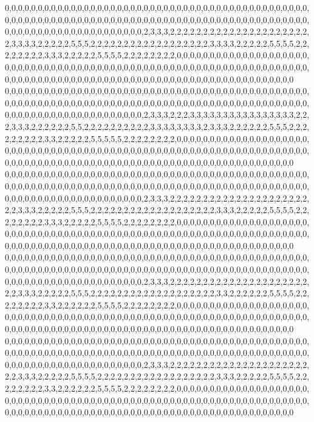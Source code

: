 0,0,0,0,0,0,0,0,0,0,0,0,0,0,0,0,0,0,0,0,0,0,0,0,0,0,0,0,0,0,0,0,0,0,0,0,0,0,0,0,0,0,0,0,0,0,0,0,0,0,0,0,0,0,0,0,0,0,0,0,0,0,0,0,0,0,0,0,0,0,0,0,0,0,0,0,0,0,0,0,0,0,0,0,0,0,0,0,0,0,0,0,0,0,0,0,0,0,0,0,0,0,0,0,0,0,0,0,0,0,0,0,0,2,3,3,3,2,2,2,2,2,2,2,2,2,2,2,2,2,2,2,2,2,2,2,2,2,2,3,3,3,3,2,2,2,2,2,5,5,5,2,2,2,2,2,2,2,2,2,2,2,2,2,2,2,2,2,2,3,3,3,3,2,2,2,2,2,5,5,5,5,2,2,2,2,2,2,2,2,3,3,3,2,2,2,2,2,5,5,5,5,2,2,2,2,2,2,2,2,0,0,0,0,0,0,0,0,0,0,0,0,0,0,0,0,0,0,0,0,0,0,0,0,0,0,0,0,0,0,0,0,0,0,0,0,0,0,0,0,0,0,0,0,0,0,0,0,0,0,0,0,0,0,0,0,0,0,0,0,0,0,0,0,0,0,0,0,0,0,0,0,0,0,0,0,0,0,0,0,0,0,0,0,0,0,0,0,0,0,0,0,0,0,0,0,0,0,0,0,0,0,0,0,0,0,0,0,0,0
0,0,0,0,0,0,0,0,0,0,0,0,0,0,0,0,0,0,0,0,0,0,0,0,0,0,0,0,0,0,0,0,0,0,0,0,0,0,0,0,0,0,0,0,0,0,0,0,0,0,0,0,0,0,0,0,0,0,0,0,0,0,0,0,0,0,0,0,0,0,0,0,0,0,0,0,0,0,0,0,0,0,0,0,0,0,0,0,0,0,0,0,0,0,0,0,0,0,0,0,0,0,0,0,0,0,0,0,0,0,0,0,0,2,3,3,3,2,2,2,3,3,3,3,3,3,3,3,3,3,3,3,3,3,3,3,2,2,2,3,3,3,2,2,2,2,2,2,5,5,2,2,2,2,2,2,2,2,2,2,3,3,3,3,3,3,3,3,2,3,3,3,2,2,2,2,2,2,5,5,5,2,2,2,2,2,2,2,2,2,3,3,2,2,2,2,2,5,5,5,5,5,2,2,2,2,2,2,2,2,0,0,0,0,0,0,0,0,0,0,0,0,0,0,0,0,0,0,0,0,0,0,0,0,0,0,0,0,0,0,0,0,0,0,0,0,0,0,0,0,0,0,0,0,0,0,0,0,0,0,0,0,0,0,0,0,0,0,0,0,0,0,0,0,0,0,0,0,0,0,0,0,0,0,0,0,0,0,0,0,0,0,0,0,0,0,0,0,0,0,0,0,0,0,0,0,0,0,0,0,0,0,0,0,0,0,0,0,0,0
0,0,0,0,0,0,0,0,0,0,0,0,0,0,0,0,0,0,0,0,0,0,0,0,0,0,0,0,0,0,0,0,0,0,0,0,0,0,0,0,0,0,0,0,0,0,0,0,0,0,0,0,0,0,0,0,0,0,0,0,0,0,0,0,0,0,0,0,0,0,0,0,0,0,0,0,0,0,0,0,0,0,0,0,0,0,0,0,0,0,0,0,0,0,0,0,0,0,0,0,0,0,0,0,0,0,0,0,0,0,0,0,0,2,3,3,3,2,2,2,2,2,2,2,2,2,2,2,2,2,2,2,2,2,2,2,2,2,2,2,3,3,3,2,2,2,2,2,5,5,5,2,2,2,2,2,2,2,2,2,2,2,2,2,2,2,2,2,2,2,3,3,3,2,2,2,2,2,5,5,5,5,2,2,2,2,2,2,2,2,3,3,3,2,2,2,2,2,5,5,5,5,2,2,2,2,2,2,2,2,0,0,0,0,0,0,0,0,0,0,0,0,0,0,0,0,0,0,0,0,0,0,0,0,0,0,0,0,0,0,0,0,0,0,0,0,0,0,0,0,0,0,0,0,0,0,0,0,0,0,0,0,0,0,0,0,0,0,0,0,0,0,0,0,0,0,0,0,0,0,0,0,0,0,0,0,0,0,0,0,0,0,0,0,0,0,0,0,0,0,0,0,0,0,0,0,0,0,0,0,0,0,0,0,0,0,0,0,0,0
0,0,0,0,0,0,0,0,0,0,0,0,0,0,0,0,0,0,0,0,0,0,0,0,0,0,0,0,0,0,0,0,0,0,0,0,0,0,0,0,0,0,0,0,0,0,0,0,0,0,0,0,0,0,0,0,0,0,0,0,0,0,0,0,0,0,0,0,0,0,0,0,0,0,0,0,0,0,0,0,0,0,0,0,0,0,0,0,0,0,0,0,0,0,0,0,0,0,0,0,0,0,0,0,0,0,0,0,0,0,0,0,0,2,3,3,3,2,2,2,2,2,2,2,2,2,2,2,2,2,2,2,2,2,2,2,2,2,2,2,3,3,3,2,2,2,2,2,5,5,5,2,2,2,2,2,2,2,2,2,2,2,2,2,2,2,2,2,2,2,3,3,2,2,2,2,2,2,5,5,5,5,2,2,2,2,2,2,2,2,3,3,2,2,2,2,2,2,5,5,5,5,2,2,2,2,2,2,2,2,0,0,0,0,0,0,0,0,0,0,0,0,0,0,0,0,0,0,0,0,0,0,0,0,0,0,0,0,0,0,0,0,0,0,0,0,0,0,0,0,0,0,0,0,0,0,0,0,0,0,0,0,0,0,0,0,0,0,0,0,0,0,0,0,0,0,0,0,0,0,0,0,0,0,0,0,0,0,0,0,0,0,0,0,0,0,0,0,0,0,0,0,0,0,0,0,0,0,0,0,0,0,0,0,0,0,0,0,0,0
0,0,0,0,0,0,0,0,0,0,0,0,0,0,0,0,0,0,0,0,0,0,0,0,0,0,0,0,0,0,0,0,0,0,0,0,0,0,0,0,0,0,0,0,0,0,0,0,0,0,0,0,0,0,0,0,0,0,0,0,0,0,0,0,0,0,0,0,0,0,0,0,0,0,0,0,0,0,0,0,0,0,0,0,0,0,0,0,0,0,0,0,0,0,0,0,0,0,0,0,0,0,0,0,0,0,0,0,0,0,0,0,0,2,3,3,3,2,2,2,2,2,2,2,2,2,2,2,2,2,2,2,2,2,2,2,2,2,2,2,3,3,3,2,2,2,2,2,5,5,5,5,2,2,2,2,2,2,2,2,2,2,2,2,2,2,2,2,2,2,3,3,3,2,2,2,2,2,5,5,5,5,2,2,2,2,2,2,2,2,3,3,2,2,2,2,2,2,5,5,5,5,2,2,2,2,2,2,2,2,0,0,0,0,0,0,0,0,0,0,0,0,0,0,0,0,0,0,0,0,0,0,0,0,0,0,0,0,0,0,0,0,0,0,0,0,0,0,0,0,0,0,0,0,0,0,0,0,0,0,0,0,0,0,0,0,0,0,0,0,0,0,0,0,0,0,0,0,0,0,0,0,0,0,0,0,0,0,0,0,0,0,0,0,0,0,0,0,0,0,0,0,0,0,0,0,0,0,0,0,0,0,0,0,0,0,0,0,0,0
